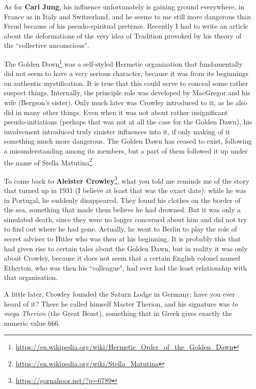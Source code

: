 As for \textbf{Carl Jung}, his influence unfortunately is gaining ground everywhere, in France as in Italy and Switzerland, and he seems to me still more dangerous than Freud because of his pseudo-spiritual pretense. Recently I had to write an article about the deformations of the very idea of Tradition provoked by his theory of the ``collective unconscious".

The Golden Dawn\footnote{\url{https://en.wikipedia.org/wiki/Hermetic_Order_of_the_Golden_Dawn}} was a self-styled Hermetic organization that fundamentally did not seem to have a very serious character, because it was from its beginnings an authentic mystification. It is true that this could serve to conceal some rather suspect things. Internally, the principle role was developed by MacGregor and his wife (Bergson's sister). Only much later was Crowley introduced to it, as he also did in many other things. Even when it was not about rather insignificant pseudo-initiations (perhaps that was not at all the case for the Golden Dawn), his involvement introduced truly sinister influences into it, if only making of it something much more dangerous. The Golden Dawn has ceased to exist, following a misunderstanding among its members, but a part of them followed it up under the name of Stella Matutina\footnote{\url{https://en.wikipedia.org/wiki/Stella_Matutina}}.

To come back to \textbf{Aleister Crowley}\footnote{\url{https://gornahoor.net/?p=6789}}, what you told me reminds me of the story that turned up in 1931 (I believe at least that was the exact date): while he was in Portugal, he suddenly disappeared. They found his clothes on the border of the sea, something that made them believe he had drowned. But it was only a simulated death, since they were no longer concerned about him and did not try to find out where he had gone. Actually, he went to Berlin to play the role of secret adviser to Hitler who was then at his beginning. It is probably this that had given rise to certain tales about the Golden Dawn, but in reality it was only about Crowley, because it does not seem that a certain English colonel named Etherton, who was then his ``colleague", had ever had the least relationship with that organisation.

A little later, Crowley founded the Saturn Lodge in Germany; have you ever heard of it? There he called himself Master Therion, and his signature was \emph{to mega Therion} (the Great Beast), something that in Greek gives exactly the numeric value 666.



